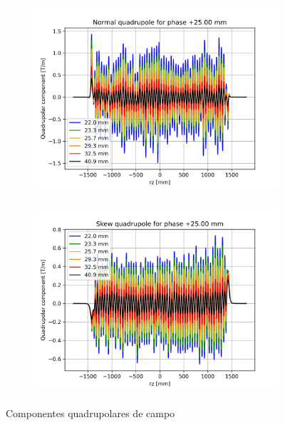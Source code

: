 \documentclass[a4paper,12pt]{article}
\begin{document}
\begin{figure}[H]
\begin{subfigure}{0.5\textwidth}
\includegraphics[width=0.9\linewidth, height=7cm]{figs/phase25 Normal quadrupole.png} 
\label{fig:subim125q}
\end{subfigure}
\begin{subfigure}{0.5\textwidth}
\includegraphics[width=0.9\linewidth, height=7cm]{figs/phase25 Skew quadrupole.png}
\label{fig:sub1quad_25}
\end{subfigure}
\caption{Componentes quadrupolares de campo}
\label{fig:quad_25}
\end{figure}
\end{document}
